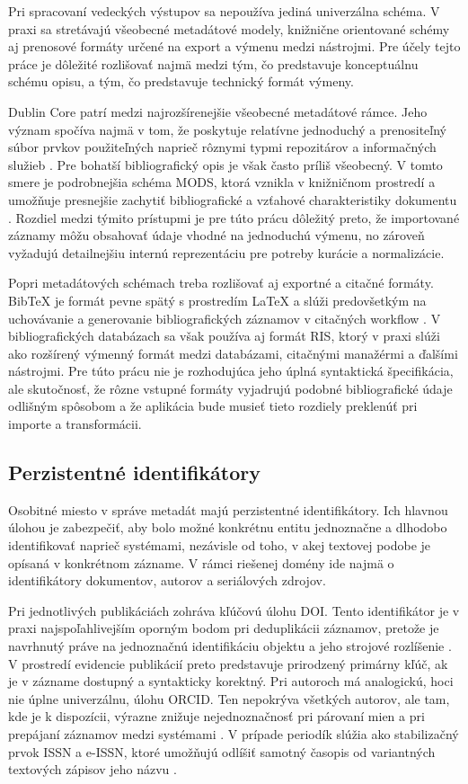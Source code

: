Pri spracovaní vedeckých výstupov sa nepoužíva jediná univerzálna schéma. V praxi sa stretávajú všeobecné metadátové modely, knižnične orientované schémy aj prenosové formáty určené na export a výmenu medzi nástrojmi. Pre účely tejto práce je dôležité rozlišovať najmä medzi tým, čo predstavuje konceptuálnu schému opisu, a tým, čo predstavuje technický formát výmeny.

Dublin Core patrí medzi najrozšírenejšie všeobecné metadátové rámce. Jeho význam spočíva najmä v tom, že poskytuje relatívne jednoduchý a prenositeľný súbor prvkov použiteľných naprieč rôznymi typmi repozitárov a informačných služieb \cite{DCMITerms}. Pre bohatší bibliografický opis je však často príliš všeobecný. V tomto smere je podrobnejšia schéma MODS, ktorá vznikla v knižničnom prostredí a umožňuje presnejšie zachytiť bibliografické a vzťahové charakteristiky dokumentu \cite{MODSUserGuide}. Rozdiel medzi týmito prístupmi je pre túto prácu dôležitý preto, že importované záznamy môžu obsahovať údaje vhodné na jednoduchú výmenu, no zároveň vyžadujú detailnejšiu internú reprezentáciu pre potreby kurácie a normalizácie.

Popri metadátových schémach treba rozlišovať aj exportné a citačné formáty. BibTeX je formát pevne spätý s prostredím \LaTeX{} a slúži predovšetkým na uchovávanie a generovanie bibliografických záznamov v citačných workflow \cite{Patashnik1988}. V bibliografických databázach sa však používa aj formát RIS, ktorý v praxi slúži ako rozšírený výmenný formát medzi databázami, citačnými manažérmi a ďalšími nástrojmi. Pre túto prácu nie je rozhodujúca jeho úplná syntaktická špecifikácia, ale skutočnosť, že rôzne vstupné formáty vyjadrujú podobné bibliografické údaje odlišným spôsobom a že aplikácia bude musieť tieto rozdiely preklenúť pri importe a transformácii.

\subsection{Perzistentné identifikátory}

Osobitné miesto v správe metadát majú perzistentné identifikátory. Ich hlavnou úlohou je zabezpečiť, aby bolo možné konkrétnu entitu jednoznačne a dlhodobo identifikovať naprieč systémami, nezávisle od toho, v akej textovej podobe je opísaná v konkrétnom zázname. V rámci riešenej domény ide najmä o identifikátory dokumentov, autorov a seriálových zdrojov.

Pri jednotlivých publikáciách zohráva kľúčovú úlohu DOI. Tento identifikátor je v praxi najspoľahlivejším oporným bodom pri deduplikácii záznamov, pretože je navrhnutý práve na jednoznačnú identifikáciu objektu a jeho strojové rozlíšenie \cite{DOIFoundation,ISO26324_2025}. V prostredí evidencie publikácií preto predstavuje prirodzený primárny kľúč, ak je v zázname dostupný a syntakticky korektný. Pri autoroch má analogickú, hoci nie úplne univerzálnu, úlohu ORCID. Ten nepokrýva všetkých autorov, ale tam, kde je k dispozícii, výrazne znižuje nejednoznačnosť pri párovaní mien a pri prepájaní záznamov medzi systémami \cite{ORCIDWhatIs}. V prípade periodík slúžia ako stabilizačný prvok ISSN a e-ISSN, ktoré umožňujú odlíšiť samotný časopis od variantných textových zápisov jeho názvu \cite{ISSNWhatIs,ISO3297_2022}.

